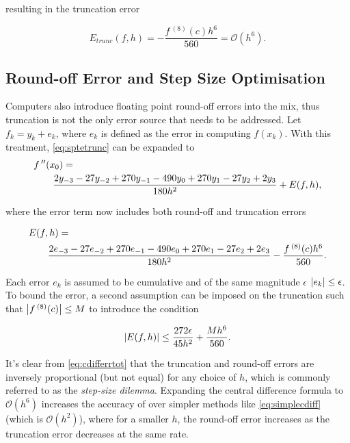 resulting in the truncation error

\begin{equation}
E_{trunc}(f,h) = -\frac{f\,^{(8)}(c)h^6}{560} = \mathcal{O}(h^6).\label{eq:etrunc}
\end{equation}

\subsection{Round-off Error and Step Size Optimisation}\label{sec:cdiffstep}

Computers also introduce floating point round-off errors into the mix, thus truncation is not the only error source that needs to be addressed.
Let $f_k = y_k +e_k$, where $e_k$ is defined as the error in computing $f(x_k)$. With this treatment, \cref{eq:sptetrunc} can be expanded to
\begin{align}
\MoveEqLeft f\,''(x_0) = \nonumber\\
&\frac{2y_{-3}-27y_{-2}+270y_{-1}-490y_{0}+270y_{1}-27y_{2}+2y_{3}}{180h^{2}}+E(f,h),\label{eq:sptye}
\end{align}

where the error term now includes both round-off and truncation errors

\begin{align}
\MoveEqLeft E(f,h) = \nonumber\\
&\frac{2e_{-3}-27e_{-2}+270e_{-1}-490e_{0}+270e_{1}-27e_{2}+2e_{3}}{180h^{2}}-\frac{f\,^{(8)}(c)h^6}{560}.
\end{align}

Each error $e_k$ is assumed to be cumulative and of the same magnitude $\epsilon$ \ie $\left\lvert e_k\right\rvert \leq \epsilon$.
To bound the error, a second assumption can be imposed on the truncation such that $\left\lvert f\,^{(8)}(c)\right\rvert \leq M$ to introduce the condition

\begin{equation}
\left\lvert E(f,h)\right\rvert \leq \frac{272\epsilon}{45h^2}+\frac{Mh^6}{560}.\label{eq:cdifferrtot}
\end{equation}

It's clear from \cref{eq:cdifferrtot} that the truncation and round-off errors are inversely proportional (but not equal) for any choice of $h$, which is commonly referred to as the \emph{step-size dilemma}.
Expanding the central difference formula to $\mathcal{O}(h^6)$ increases the accuracy of over simpler methods like \cref{eq:simplecdiff} (which is $\mathcal{O}(h^2)$), where for a smaller $h$, the round-off error increases as the truncation error decreases at the same rate.

